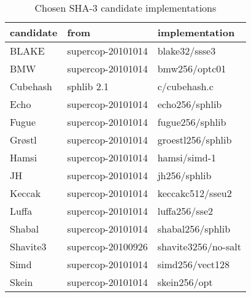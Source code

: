 \begin{table}
  \centering
  \caption{Chosen \ac{SHA}-3 candidate implementations}
  \begin{tabular}{ | l | l | l | }
    \hline
    \textbf{candidate} & \textbf{from} & \textbf{implementation} \\ \hline
     BLAKE      & supercop-20101014 & blake32/ssse3 \\ \hline
     \ac{BMW}   & supercop-20101014 & bmw256/optc01 \\ \hline
     Cubehash   & sphlib 2.1        & c/cubehash.c  \\ \hline
     Echo       & supercop-20101014 & echo256/sphlib\\ \hline
     Fugue      & supercop-20101014 & fugue256/sphlib\\ \hline
     Grøstl    & supercop-20101014 & groestl256/sphlib\\ \hline
     Hamsi      & supercop-20101014 & hamsi/simd-1  \\ \hline
     JH         & supercop-20101014 & jh256/sphlib  \\ \hline
     Keccak     & supercop-20101014 & keccakc512/sseu2 \\ \hline
     Luffa      & supercop-20101014 & luffa256/sse2 \\ \hline
     Shabal     & supercop-20101014 & shabal256/sphlib\\ \hline
     Shavite3   & supercop-20100926 & shavite3256/no-salt       \\ \hline
     Simd       & supercop-20101014 & simd256/vect128 \\ \hline
     Skein      & supercop-20101014 & skein256/opt           \\ \hline
  \end{tabular}
  \label{tbl:sha3:implementations}
\end{table}
